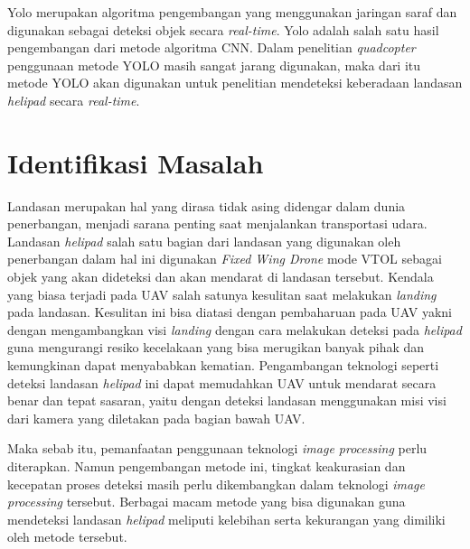 Yolo merupakan algoritma pengembangan yang menggunakan jaringan saraf dan digunakan sebagai deteksi objek secara \textit{real-time}. Yolo adalah salah satu hasil pengembangan dari metode algoritma CNN. Dalam penelitian \textit{quadcopter} penggunaan metode YOLO masih sangat jarang digunakan, maka dari itu metode YOLO akan digunakan untuk penelitian mendeteksi keberadaan landasan \textit{helipad} secara \textit{real-time}.
 

\section{Identifikasi Masalah}
Landasan merupakan hal yang dirasa tidak asing didengar dalam dunia penerbangan, menjadi sarana penting saat menjalankan transportasi udara. Landasan \textit{helipad} salah satu bagian dari landasan yang digunakan oleh penerbangan dalam hal ini digunakan \textit{Fixed Wing Drone} mode VTOL sebagai objek yang akan dideteksi dan akan mendarat di landasan tersebut. Kendala yang biasa terjadi pada UAV salah satunya kesulitan saat melakukan \textit{landing} pada landasan. Kesulitan ini bisa diatasi dengan pembaharuan pada UAV yakni dengan mengambangkan visi \textit{landing} dengan cara melakukan deteksi pada \textit{helipad} guna mengurangi resiko kecelakaan yang bisa merugikan banyak pihak dan kemungkinan dapat menyababkan kematian. Pengambangan teknologi seperti deteksi landasan \textit{helipad} ini dapat memudahkan UAV untuk mendarat secara benar dan tepat sasaran, yaitu dengan deteksi landasan menggunakan misi visi dari kamera yang diletakan pada bagian bawah UAV. 

Maka sebab itu, pemanfaatan penggunaan teknologi \textit{image processing} perlu diterapkan. Namun pengembangan metode ini, tingkat keakurasian dan kecepatan proses deteksi masih perlu dikembangkan dalam teknologi \textit{image processing} tersebut. Berbagai macam metode yang bisa digunakan guna mendeteksi landasan \textit{helipad} meliputi kelebihan serta kekurangan yang dimiliki oleh metode tersebut.

